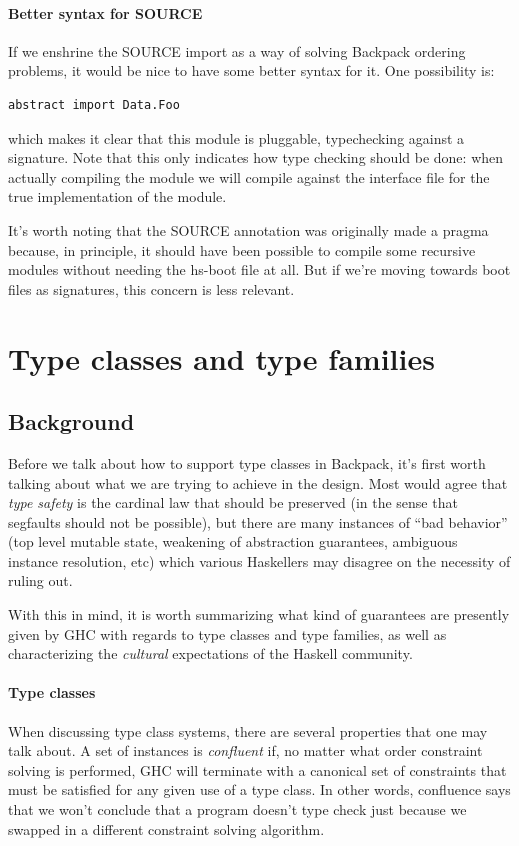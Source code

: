 \documentclass{article}
\begin{document}
\paragraph{Better syntax for SOURCE}  If we enshrine the SOURCE import
as a way of solving Backpack ordering problems, it would be nice to have
some better syntax for it. One possibility is:

\begin{verbatim}
abstract import Data.Foo
\end{verbatim}

which makes it clear that this module is pluggable, typechecking against
a signature.  Note that this only indicates how type checking should be
done: when actually compiling the module we will compile against the
interface file for the true implementation of the module.

It's worth noting that the SOURCE annotation was originally made a
pragma because, in principle, it should have been possible to compile
some recursive modules without needing the hs-boot file at all. But if
we're moving towards boot files as signatures, this concern is less
relevant.

\section{Type classes and type families}

\subsection{Background}

Before we talk about how to support type classes in Backpack, it's first
worth talking about what we are trying to achieve in the design.  Most
would agree that \emph{type safety} is the cardinal law that should be
preserved (in the sense that segfaults should not be possible), but
there are many instances of ``bad behavior'' (top level mutable state,
weakening of abstraction guarantees, ambiguous instance resolution, etc)
which various Haskellers may disagree on the necessity of ruling out.

With this in mind, it is worth summarizing what kind of guarantees are
presently given by GHC with regards to type classes and type families,
as well as characterizing the \emph{cultural} expectations of the
Haskell community.

\paragraph{Type classes}  When discussing type class systems, there are
several properties that one may talk about.
A set of instances is \emph{confluent} if, no matter what order
constraint solving is performed, GHC will terminate with a canonical set
of constraints that must be satisfied for any given use of a type class.
In other words, confluence says that we won't conclude that a program
doesn't type check just because we swapped in a different constraint
solving algorithm.
\end{document}
